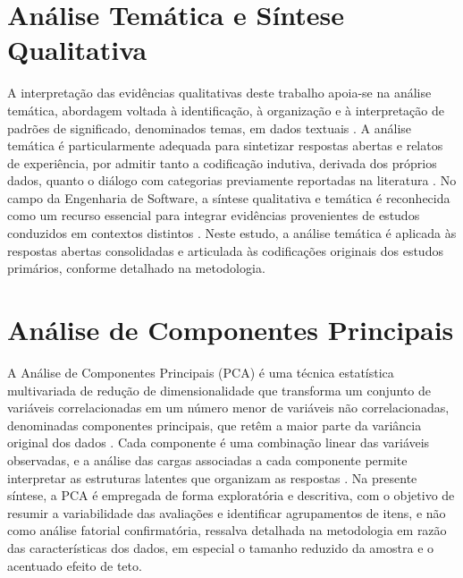 \section{Análise Temática e Síntese Qualitativa}

A interpretação das evidências qualitativas deste trabalho apoia-se na análise temática, abordagem voltada à identificação, à organização e à interpretação de padrões de significado, denominados temas, em dados textuais \cite{braunclarke2006}. A análise temática é particularmente adequada para sintetizar respostas abertas e relatos de experiência, por admitir tanto a codificação indutiva, derivada dos próprios dados, quanto o diálogo com categorias previamente reportadas na literatura \cite{saldana2013}. No campo da Engenharia de Software, a síntese qualitativa e temática é reconhecida como um recurso essencial para integrar evidências provenientes de estudos conduzidos em contextos distintos \cite{cruzesdyba2010}. Neste estudo, a análise temática é aplicada às respostas abertas consolidadas e articulada às codificações originais dos estudos primários, conforme detalhado na metodologia.

\section{Análise de Componentes Principais}

A Análise de Componentes Principais (PCA) é uma técnica estatística multivariada de redução de dimensionalidade que transforma um conjunto de variáveis correlacionadas em um número menor de variáveis não correlacionadas, denominadas componentes principais, que retêm a maior parte da variância original dos dados \cite{jolliffe2002}. Cada componente é uma combinação linear das variáveis observadas, e a análise das cargas associadas a cada componente permite interpretar as estruturas latentes que organizam as respostas \cite{hair2019}. Na presente síntese, a PCA é empregada de forma exploratória e descritiva, com o objetivo de resumir a variabilidade das avaliações e identificar agrupamentos de itens, e não como análise fatorial confirmatória, ressalva detalhada na metodologia em razão das características dos dados, em especial o tamanho reduzido da amostra e o acentuado efeito de teto.